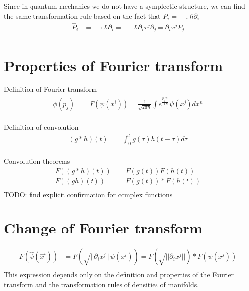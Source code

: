 \documentclass[11pt]{article}
\begin{document}
Since in quantum mechanics we do not have a symplectic structure, we can find the same transformation rule based on the fact that $P_i = -\imath \hbar \partial_i$
\begin{equation}
	\begin{aligned}
		\hat{P}_i &= -\imath \hbar \partial_i = -\imath \hbar \partial_i x^j \partial_j = \partial_i x^j P_j \\
	\end{aligned}
\end{equation}

\section{Properties of Fourier transform}

Definition of Fourier transform
\begin{equation}
	\begin{aligned}
		\phi(p_j) &= F(\psi(x^i)) = \frac{1}{\sqrt{2 \pi \hbar}} \int e^{\frac{p_j x^j}{\imath \hbar}} \psi(x^j) dx^n \\
	\end{aligned}
\end{equation}

Definition of convolution
\begin{equation}
	\begin{aligned}
		(g * h)(t) &= \int_{0}^{t} g(\tau) h(t-\tau) d\tau\\
	\end{aligned}
\end{equation}

Convolution theorems
\begin{equation}
	\begin{aligned}
		F((g * h)(t)) &= F(g(t)) F(h(t))\\
		F((g h)(t)) &= F(g(t)) * F(h(t))\\
	\end{aligned}
\end{equation}
TODO: find explicit confirmation for complex functions

\section{Change of Fourier transform}
\begin{equation}
	\begin{aligned}
		F(\hat{\psi}(\hat{x}^i)) &= F\left(\sqrt{|| \partial_i x^j ||} \psi(x^j)\right) = F\left(\sqrt{|| \partial_i x^j ||}\right) * F \left( \psi(x^j)\right)  \\
	\end{aligned}
\end{equation}
This expression depends only on the definition and properties of the Fourier transform and the transformation rules of densities of manifolds.
\end{document}
